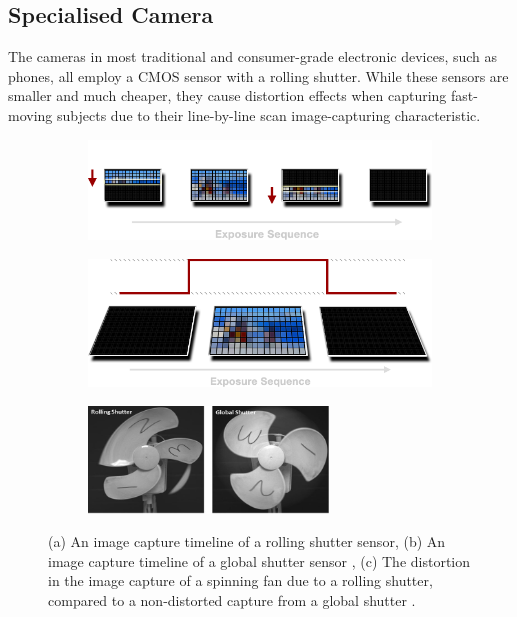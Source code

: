 \subsection{Specialised Camera}
The cameras in most traditional and consumer-grade electronic devices, such as phones, all employ a CMOS sensor with a rolling shutter. While these sensors are smaller and much cheaper, they cause distortion effects when capturing fast-moving subjects due to their line-by-line scan image-capturing characteristic. 

\begin{figure}[h]
    \centering
    \begin{subfigure}{.49\textwidth}
        \centering
        \includegraphics[width=1\linewidth]{assets/rolling-shutter-timeline.png}
        \caption{}
        \label{subfig:rs_timeline}
    \end{subfigure}
    \hfill
    \begin{subfigure}{.49\textwidth}
        \centering
        \includegraphics[width=1\linewidth]{assets/global-shutter-timeline.png}
        \caption{}
        \label{subfig:gs_timeline}
    \end{subfigure}
    \hfill
    \begin{subfigure}{0.49\textwidth}
        \centering
        \includegraphics[width=0.7\textwidth]{assets/rolling-vs-global-shutter.jpeg}
        \caption{}
        \label{subfig:rs_vs_gs}
    \end{subfigure}
    \caption{(a) An image capture timeline of a rolling shutter sensor, (b) An image capture timeline of a global shutter sensor \cite{reddigitalcinemaGlobalRollingShutters}, (c) The distortion in the image capture of a spinning fan due to a rolling shutter, compared to a non-distorted capture from a global shutter \cite{RollingShutterVs}.}
    \label{fig:rs_vs_gs}
\end{figure}

